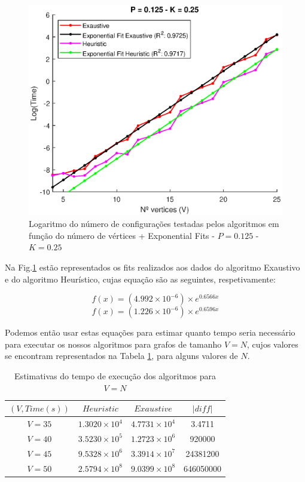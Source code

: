 \documentclass{revdetua}
\begin{document}
\begin{figure}[h!]
\centering
\includegraphics[scale = 0.5]{Figs/extrapol.eps}
\caption{Logaritmo do número de configurações testadas pelos algoritmos em função do número de vértices + Exponential Fits - $P = 0.125$ - $K = 0.25$}
\label{extrapol}
\end{figure}

Na Fig.\ref{extrapol} estão representados os fits realizados aos dados do algoritmo Exaustivo e do algoritmo Heurístico, cujas equação são as seguintes, respetivamente:

\[
    f(x) = (4.992\times 10^{-6})  \times e^{0.6566x}
\]
\[
    f(x) = (1.226\times 10^{-6}) \times e^{0.6596x}
\]

Podemos então usar estas equações para estimar quanto tempo seria necessário para executar os nossos algoritmos para grafos de tamanho $V = N$, cujos valores se encontram representados na Tabela \ref{extr}, para alguns valores de $N$.


\begin{table}[h!]
\centering
\small
\caption{Estimativas do tempo de execução dos algoritmos para $V = N$}
\label{extr}
\begin{tabular}{|c|c|c|c|}
\hline
 $(V, Time(s))$  & $Heuristic$  & $Exaustive$ & $|diff|$\\ \hline
$V = 35$  & $1.3020\times 10^{4}$ & $4.7731\times 10^{4}$ & 3.4711\\ \hline
$V = 40$  & $3.5230\times 10^{5}$ & $1.2723\times 10^{6}$ & 920000\\ \hline
$V = 45$ & $9.5328\times 10^{6}$ & $3.3914\times 10^{7}$ & 24381200\\ \hline
$V = 50$  & $2.5794\times 10^{8}$ &  $9.0399\times 10^{8}$ & 646050000\\ \hline
\end{tabular}
\end{table}
\end{document}
